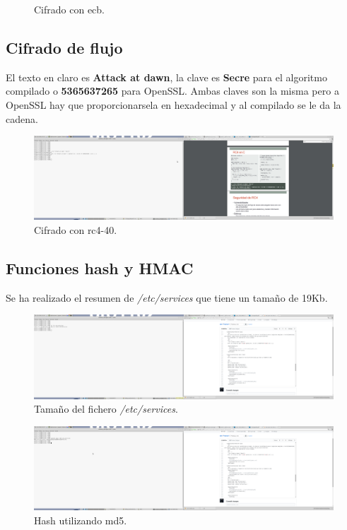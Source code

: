 \documentclass[11pt]{article}
\begin{document}
\begin{figure}[!h]
\begin{minipage}[c]{.5\textwidth}
          \caption{Cifrado con ecb.}
        \end{minipage}
      \end{figure}

    \subsection{Cifrado de flujo}
      \par
      El texto en claro es \textbf{Attack at dawn}, la clave es \textbf{Secre} para el algoritmo compilado o \textbf{5365637265} para OpenSSL. Ambas claves son la misma pero a OpenSSL hay que proporcionarsela
      en hexadecimal y al compilado se le da la cadena.

      \begin{figure}[!h]
        \centering
        \includegraphics[width = .9\textwidth]{cipher_rc4}
        \caption{Cifrado con rc4-40.}
      \end{figure}

    \subsection{Funciones hash y HMAC}
      \par
      Se ha realizado el resumen de \textit{/etc/services} que tiene un tamaño de 19Kb.
      \begin{figure}[!h]
        \centering
        \includegraphics[width = .9\textwidth]{etcserv_size}
        \caption{Tamaño del fichero \textit{/etc/services}.}
      \end{figure}

      \begin{figure}[!h]
        \centering
        \includegraphics[width = .9\textwidth]{hash_md5}
        \caption{Hash utilizando md5.}
      \end{figure}
\end{document}
